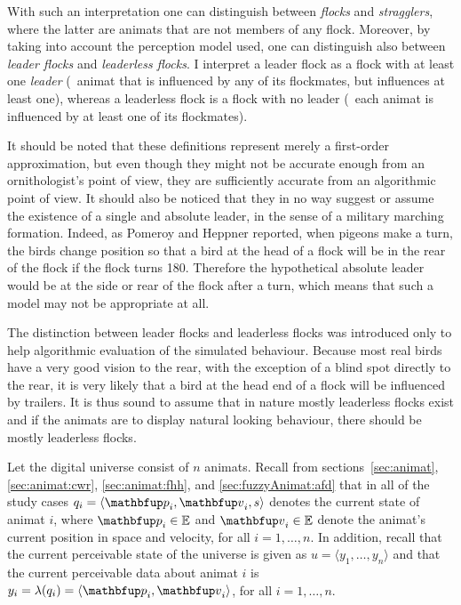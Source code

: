 With such an interpretation one can distinguish between \emph{flocks} and \emph{stragglers}, where the latter are animats that are not members of any flock. Moreover, by taking into account the perception model used, one can distinguish also between \emph{leader flocks} and \emph{leaderless flocks}. I interpret a leader flock as a flock with at least one \emph{leader} (\ie\ animat that is  influenced by any of its flockmates, but influences at least one), whereas a leaderless flock is a flock with no leader (\ie\ each animat is influenced by at least one of its flockmates). 

It should be noted that these definitions represent merely a first-order approximation, but even though they might not be accurate enough from an ornithologist's point of view, they are sufficiently accurate from an algorithmic point of view. It should also be noticed that they in no way suggest or assume the existence of a single and absolute leader, in the sense of a military marching formation. Indeed, as Pomeroy and Heppner \cite{pomeroy:1992} reported, when pigeons make a turn, the birds change position so that a bird at the head of a flock will be in the rear of the flock if the flock turns 180\deg. Therefore the hypothetical absolute leader would be at the side or rear of the flock after a turn, which means that such a model may not be appropriate at all. 

The distinction between leader flocks and leaderless flocks was introduced only to help algorithmic evaluation of the simulated behaviour. Because most real birds have a very good vision to the rear, with the exception of a blind spot directly to the rear, it is very likely that a bird at the head end of a flock will be influenced by trailers. It is thus sound to assume that in nature mostly leaderless flocks exist and if the animats are to display natural looking behaviour, there should be mostly leaderless flocks.

Let the digital universe consist of $n$ animats. Recall from sections~\ref{sec:animat}, \ref{sec:animat:cwr}, \ref{sec:animat:fhh}, and \ref{sec:fuzzyAnimat:afd} that in all of the study cases $q_i=\langle \vect{p}_i, \vect{v}_i, s \rangle$ denotes the current state of animat $i$, where $\vect{p}_i \in \E$ and $\vect{v}_i \in \E$ denote the animat's current position in space and velocity, for all $i=1,\ldots,n$. In addition, recall that the current perceivable state of the universe is given as $u=\langle y_1,\ldots,y_n\rangle$ and that the current perceivable data about animat $i$ is $y_i=\lambda(q_i)=\langle\vect{p}_i,\vect{v}_i\rangle$, for all $i=1,\ldots,n$. 

